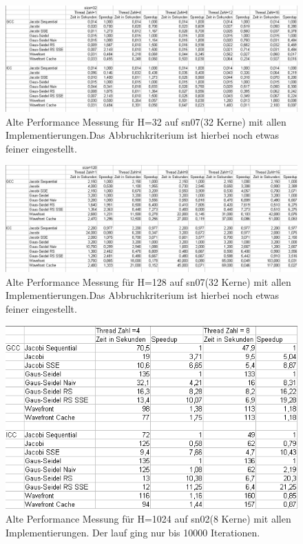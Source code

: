 \documentclass{article}
\begin{document}
\begin{figure}[h] 
  \centering
     \includegraphics[width=1.0\textwidth]{bilder/sn0732.png}
  \caption{Alte Performance Messung für H=32 auf sn07(32 Kerne) mit allen Implementierungen.Das Abbruchkriterium ist hierbei noch etwas feiner eingestellt.}
\end{figure}

\begin{figure}[h] 
  \centering
     \includegraphics[width=1.0\textwidth]{bilder/sn07128.png}
  \caption{Alte Performance Messung für H=128 auf sn07(32 Kerne) mit allen Implementierungen.Das Abbruchkriterium ist hierbei noch etwas feiner eingestellt.}
\end{figure}

\begin{figure}[h] 
  \centering
     \includegraphics[width=1.0\textwidth]{bilder/sn021024.png}
  \caption{Alte Performance Messung für H=1024 auf sn02(8 Kerne) mit allen Implementierungen. Der lauf ging nur bis 10000 Iterationen.}
\end{figure}
\end{document}
